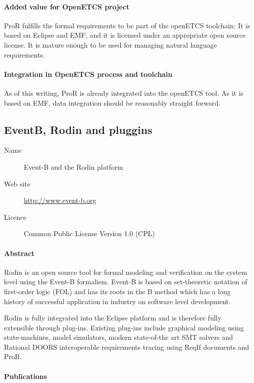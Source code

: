 \paragraph{Added value for OpenETCS project}

ProR fulfills the formal requirements to be part of the openETCS toolchain: It is based on Eclipse and EMF, and it is licensed under an appropriate open source license.  It is mature enough to be used for managing natural language requirements.

\paragraph{Integration in OpenETCS process and toolchain}

As of this writing, ProR is already integrated into the openETCS tool.  As it is based on EMF, data integration should be reasonably straight forward.


\subsection{EventB, Rodin and pluggins}
\label{sec:EventB_m}

\begin{description}
\item[Name] Event-B and the Rodin platform
\item[Web site] \url{http://www.event-b.org}
\item[Licence] Common Public License Version 1.0 (CPL)
\end{description}

\paragraph{Abstract}

Rodin is an open source tool for formal modeling and verification on the system
level using the Event-B formalism. Event-B is based on set-theoretic notation of
first-order logic (FOL) and has its roots in the B method which has a long
history of successful application in industry on software level development.

Rodin is fully integrated into the Eclipse platform and is therefore fully
extensible through plug-ins. Existing plug-ins include graphical modeling using
state-machines, model simulators, modern state-of-the art SMT solvers and
Rational DOORS interoperable requirements tracing using ReqIf documents and
ProR.

\paragraph{Publications}

